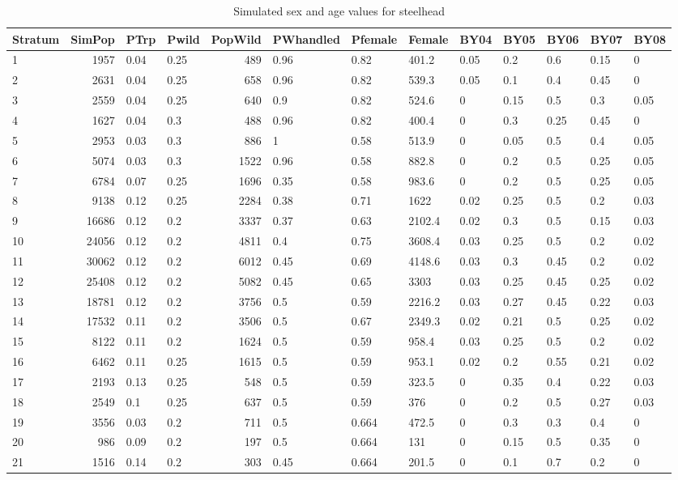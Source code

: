 \documentclass[12pt]{article}
\begin{document}
\begin{sidewaystable} %
\caption{Simulated sex and age values for steelhead}
\label{table:SHsim}
\footnotesize
\begin{tabular}{ | l | r | l | l | r | l | l | l | l |l | l | l | l | }
\hline
Stratum&SimPop&PTrp&Pwild&PopWild&PWhandled&Pfemale&Female&BY04&BY05&BY06&BY07&BY08 \\ \hline
1&1957&0.04&0.25&489&0.96&0.82&401.2&0.05&0.2&0.6&0.15&0 \\ \hline
2&2631&0.04&0.25&658&0.96&0.82&539.3&0.05&0.1&0.4&0.45&0 \\ \hline
3&2559&0.04&0.25&640&0.9&0.82&524.6&0&0.15&0.5&0.3&0.05 \\ \hline
4&1627&0.04&0.3&488&0.96&0.82&400.4&0&0.3&0.25&0.45&0 \\ \hline
5&2953&0.03&0.3&886&1&0.58&513.9&0&0.05&0.5&0.4&0.05 \\ \hline
6&5074&0.03&0.3&1522&0.96&0.58&882.8&0&0.2&0.5&0.25&0.05 \\ \hline
7&6784&0.07&0.25&1696&0.35&0.58&983.6&0&0.2&0.5&0.25&0.05 \\ \hline
8&9138&0.12&0.25&2284&0.38&0.71&1622&0.02&0.25&0.5&0.2&0.03 \\ \hline
9&16686&0.12&0.2&3337&0.37&0.63&2102.4&0.02&0.3&0.5&0.15&0.03 \\ \hline
10&24056&0.12&0.2&4811&0.4&0.75&3608.4&0.03&0.25&0.5&0.2&0.02 \\ \hline
11&30062&0.12&0.2&6012&0.45&0.69&4148.6&0.03&0.3&0.45&0.2&0.02 \\ \hline
12&25408&0.12&0.2&5082&0.45&0.65&3303&0.03&0.25&0.45&0.25&0.02 \\ \hline
13&18781&0.12&0.2&3756&0.5&0.59&2216.2&0.03&0.27&0.45&0.22&0.03 \\ \hline
14&17532&0.11&0.2&3506&0.5&0.67&2349.3&0.02&0.21&0.5&0.25&0.02 \\ \hline
15&8122&0.11&0.2&1624&0.5&0.59&958.4&0.03&0.25&0.5&0.2&0.02 \\ \hline
16&6462&0.11&0.25&1615&0.5&0.59&953.1&0.02&0.2&0.55&0.21&0.02 \\ \hline
17&2193&0.13&0.25&548&0.5&0.59&323.5&0&0.35&0.4&0.22&0.03 \\ \hline
18&2549&0.1&0.25&637&0.5&0.59&376&0&0.2&0.5&0.27&0.03 \\ \hline
19&3556&0.03&0.2&711&0.5&0.664&472.5&0&0.3&0.3&0.4&0 \\ \hline
20&986&0.09&0.2&197&0.5&0.664&131&0&0.15&0.5&0.35&0 \\ \hline
21&1516&0.14&0.2&303&0.45&0.664&201.5&0&0.1&0.7&0.2&0 \\ \hline

\end{tabular}
\end{sidewaystable}
\end{document}
